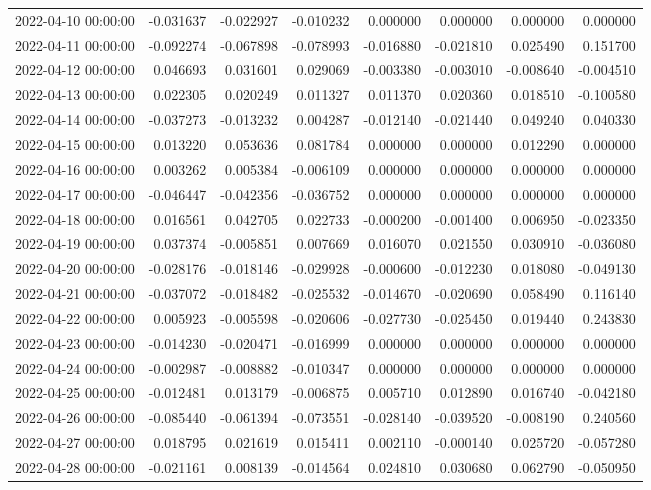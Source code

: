 \begin{tabular}{lrrrrrrr}
2022-04-10 00:00:00 & -0.031637 & -0.022927 & -0.010232 & 0.000000 & 0.000000 & 0.000000 & 0.000000 \\
2022-04-11 00:00:00 & -0.092274 & -0.067898 & -0.078993 & -0.016880 & -0.021810 & 0.025490 & 0.151700 \\
2022-04-12 00:00:00 & 0.046693 & 0.031601 & 0.029069 & -0.003380 & -0.003010 & -0.008640 & -0.004510 \\
2022-04-13 00:00:00 & 0.022305 & 0.020249 & 0.011327 & 0.011370 & 0.020360 & 0.018510 & -0.100580 \\
2022-04-14 00:00:00 & -0.037273 & -0.013232 & 0.004287 & -0.012140 & -0.021440 & 0.049240 & 0.040330 \\
2022-04-15 00:00:00 & 0.013220 & 0.053636 & 0.081784 & 0.000000 & 0.000000 & 0.012290 & 0.000000 \\
2022-04-16 00:00:00 & 0.003262 & 0.005384 & -0.006109 & 0.000000 & 0.000000 & 0.000000 & 0.000000 \\
2022-04-17 00:00:00 & -0.046447 & -0.042356 & -0.036752 & 0.000000 & 0.000000 & 0.000000 & 0.000000 \\
2022-04-18 00:00:00 & 0.016561 & 0.042705 & 0.022733 & -0.000200 & -0.001400 & 0.006950 & -0.023350 \\
2022-04-19 00:00:00 & 0.037374 & -0.005851 & 0.007669 & 0.016070 & 0.021550 & 0.030910 & -0.036080 \\
2022-04-20 00:00:00 & -0.028176 & -0.018146 & -0.029928 & -0.000600 & -0.012230 & 0.018080 & -0.049130 \\
2022-04-21 00:00:00 & -0.037072 & -0.018482 & -0.025532 & -0.014670 & -0.020690 & 0.058490 & 0.116140 \\
2022-04-22 00:00:00 & 0.005923 & -0.005598 & -0.020606 & -0.027730 & -0.025450 & 0.019440 & 0.243830 \\
2022-04-23 00:00:00 & -0.014230 & -0.020471 & -0.016999 & 0.000000 & 0.000000 & 0.000000 & 0.000000 \\
2022-04-24 00:00:00 & -0.002987 & -0.008882 & -0.010347 & 0.000000 & 0.000000 & 0.000000 & 0.000000 \\
2022-04-25 00:00:00 & -0.012481 & 0.013179 & -0.006875 & 0.005710 & 0.012890 & 0.016740 & -0.042180 \\
2022-04-26 00:00:00 & -0.085440 & -0.061394 & -0.073551 & -0.028140 & -0.039520 & -0.008190 & 0.240560 \\
2022-04-27 00:00:00 & 0.018795 & 0.021619 & 0.015411 & 0.002110 & -0.000140 & 0.025720 & -0.057280 \\
2022-04-28 00:00:00 & -0.021161 & 0.008139 & -0.014564 & 0.024810 & 0.030680 & 0.062790 & -0.050950 \\

\end{tabular}

